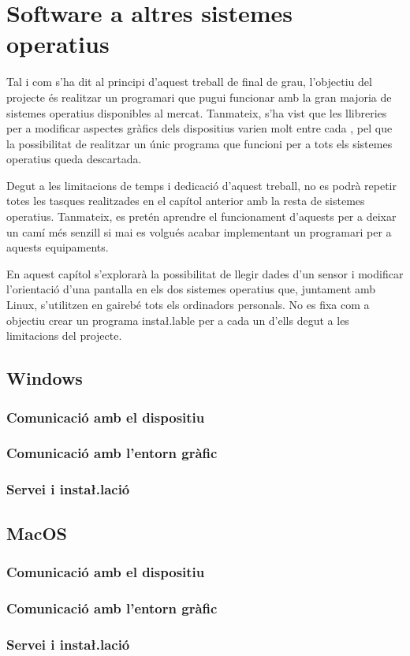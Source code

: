 \chapter{Software a altres sistemes operatius}
\label{cap:software-other}

Tal i com s'ha dit al principi d'aquest treball de final de grau, l'objectiu
del projecte és realitzar un programari que pugui funcionar amb la gran majoria
de sistemes operatius disponibles al mercat. Tanmateix, s'ha vist que les
llibreries per a modificar aspectes gràfics dels dispositius varien molt entre
cada , pel que la possibilitat de realitzar un únic programa que
funcioni per a tots els sistemes operatius queda descartada.

Degut a les limitacions de temps i dedicació d'aquest treball, no es podrà
repetir totes les tasques realitzades en el capítol anterior amb la resta
de sistemes operatius. Tanmateix, es pretén aprendre el funcionament d'aquests
per a deixar un camí més senzill si mai es volgués acabar implementant un
programari per a aquests equipaments.

En aquest capítol s'explorarà la possibilitat de llegir dades d'un sensor
 i modificar l'orientació d'una pantalla en els dos sistemes operatius
que, juntament amb Linux, s'utilitzen en gairebé tots els ordinadors personals.
No es fixa com a objectiu crear un programa insta\l.lable per a cada un d'ells
degut a les limitacions del projecte.

\section{Windows}
\subsection{Comunicació amb el dispositiu}
\subsection{Comunicació amb l'entorn gràfic}
\subsection{Servei i insta\l.lació}

\section{MacOS}
\subsection{Comunicació amb el dispositiu}
\subsection{Comunicació amb l'entorn gràfic}
\subsection{Servei i insta\l.lació}

